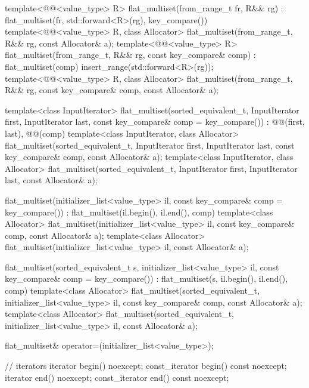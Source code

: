 \begin{codeblock}
{{    template<@@<value_type> R>
      flat_multiset(from_range_t fr, R&& rg)
        : flat_multiset(fr, std::forward<R>(rg), key_compare()) { }
    template<@@<value_type> R, class Allocator>
      flat_multiset(from_range_t, R&& rg, const Allocator& a);
    template<@@<value_type> R>
      flat_multiset(from_range_t, R&& rg, const key_compare& comp)
        : flat_multiset(comp)
        { insert_range(std::forward<R>(rg)); }
    template<@@<value_type> R, class Allocator>
      flat_multiset(from_range_t, R&& rg, const key_compare& comp, const Allocator& a);

    template<class InputIterator>
      flat_multiset(sorted_equivalent_t, InputIterator first, InputIterator last,
                    const key_compare& comp = key_compare())
        : @@(first, last), @@(comp) { }
    template<class InputIterator, class Allocator>
      flat_multiset(sorted_equivalent_t, InputIterator first, InputIterator last,
                    const key_compare& comp, const Allocator& a);
    template<class InputIterator, class Allocator>
      flat_multiset(sorted_equivalent_t, InputIterator first, InputIterator last,
                    const Allocator& a);

    flat_multiset(initializer_list<value_type> il, const key_compare& comp = key_compare())
      : flat_multiset(il.begin(), il.end(), comp) { }
    template<class Allocator>
      flat_multiset(initializer_list<value_type> il, const key_compare& comp,
                    const Allocator& a);
    template<class Allocator>
      flat_multiset(initializer_list<value_type> il, const Allocator& a);

    flat_multiset(sorted_equivalent_t s, initializer_list<value_type> il,
                  const key_compare& comp = key_compare())
        : flat_multiset(s, il.begin(), il.end(), comp) { }
    template<class Allocator>
      flat_multiset(sorted_equivalent_t, initializer_list<value_type> il,
                    const key_compare& comp, const Allocator& a);
    template<class Allocator>
      flat_multiset(sorted_equivalent_t, initializer_list<value_type> il, const Allocator& a);

    flat_multiset& operator=(initializer_list<value_type>);

    // iterators
    iterator               begin() noexcept;
    const_iterator         begin() const noexcept;
    iterator               end() noexcept;
    const_iterator         end() const noexcept;

}}
\end{codeblock}
